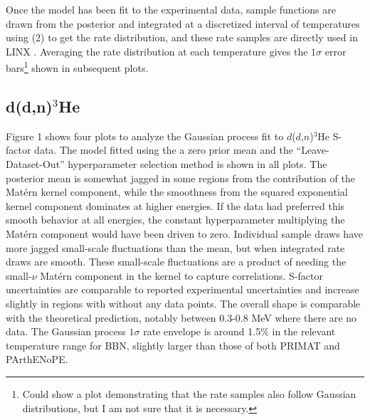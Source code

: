 \documentclass[%
 reprint,
superscriptaddress,
nofootinbib,
 amsmath,amssymb,
 aps,
 pra,
]{revtex4-2}
\begin{document}
Once the model has been fit to the experimental data, sample functions are drawn from the posterior and integrated at a discretized interval of temperatures using (2) to get the rate distribution, and these rate samples are directly used in LINX \cite{Giovanetti2024}. Averaging the rate distribution at each temperature gives the $1\sigma$ error bars\footnote{Could show a plot demonstrating that the rate samples also follow Gaussian distributions, but I am not sure that it is necessary.} shown in subsequent plots.

\subsection{d(d,n)$^3$He}

Figure 1 shows four plots to analyze the Gaussian process fit to $d$($d$,$n$)$^3$He S-factor data. The model fitted using the a zero prior mean and the ``Leave-Dataset-Out''  hyperparameter selection method is shown in all plots. The posterior mean is somewhat jagged in some regions from the contribution of the Mat\'ern kernel component, while the smoothness from the squared exponential kernel component dominates at higher energies. If the data had preferred this smooth behavior at all energies, the constant hyperparameter multiplying the Mat\'ern component would have been driven to zero. Individual sample draws have more jagged small-scale fluctuations than the mean, but when integrated rate draws are smooth. These small-scale fluctuations are a product of needing the small-$\nu$ Mat\'ern component in the kernel to capture correlations. S-factor uncertainties are comparable to reported experimental uncertainties and increase slightly in regions with without any data points. The overall shape is comparable with the theoretical prediction, notably between 0.3-0.8 MeV where there are no data. The Gaussian process $1\sigma$ rate envelope is around 1.5\% in the relevant temperature range for BBN, slightly larger than those of both PRIMAT and PArthENoPE. 
\end{document}
